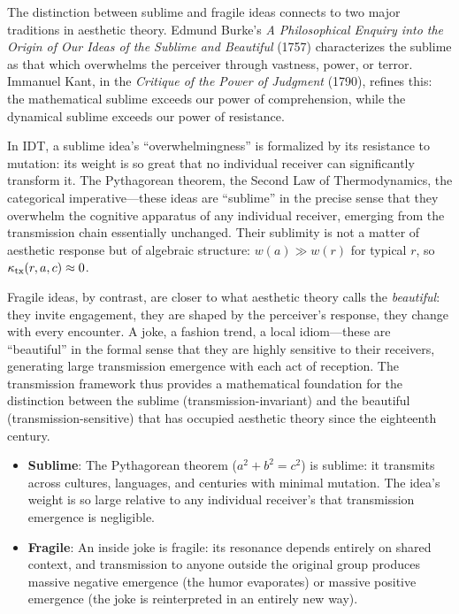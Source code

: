 \begin{interpretation}\label{interp:ch7:sublime_aesthetic}
The distinction between sublime and fragile ideas connects to two major
traditions in aesthetic theory. Edmund Burke's \emph{A Philosophical
Enquiry into the Origin of Our Ideas of the Sublime and Beautiful} (1757)
characterizes the sublime as that which overwhelms the perceiver through
vastness, power, or terror. Immanuel Kant, in the \emph{Critique of the
Power of Judgment} (1790), refines this: the mathematical sublime exceeds
our power of comprehension, while the dynamical sublime exceeds our power
of resistance.

In IDT, a sublime idea's ``overwhelmingness'' is formalized by its
resistance to mutation: its weight is so great that no individual receiver
can significantly transform it. The Pythagorean theorem, the Second Law
of Thermodynamics, the categorical imperative---these ideas are ``sublime''
in the precise sense that they overwhelm the cognitive apparatus of
any individual receiver, emerging from the transmission chain essentially
unchanged. Their sublimity is not a matter of aesthetic response but of
algebraic structure: $w(a) \gg w(r)$ for typical $r$, so
$\kappa_{\text{tx}}(r, a, c) \approx 0$.

Fragile ideas, by contrast, are closer to what aesthetic theory calls the
\emph{beautiful}: they invite engagement, they are shaped by the
perceiver's response, they change with every encounter. A joke, a
fashion trend, a local idiom---these are ``beautiful'' in the formal
sense that they are highly sensitive to their receivers, generating
large transmission emergence with each act of reception. The
transmission framework thus provides a mathematical foundation for the
distinction between the sublime (transmission-invariant) and the beautiful
(transmission-sensitive) that has occupied aesthetic theory since the
eighteenth century.
\end{interpretation}

\begin{example}
\begin{itemize}
    \item \textbf{Sublime}: The Pythagorean theorem ($a^2 + b^2 = c^2$)
    is sublime: it transmits across cultures, languages, and centuries
    with minimal mutation. The idea's weight is so large relative to
    any individual receiver's that transmission emergence is negligible.

    \item \textbf{Fragile}: An inside joke is fragile: its resonance
    depends entirely on shared context, and transmission to anyone
    outside the original group produces massive negative emergence
    (the humor evaporates) or massive positive emergence (the joke
    is reinterpreted in an entirely new way).
\end{itemize}
\end{example}


